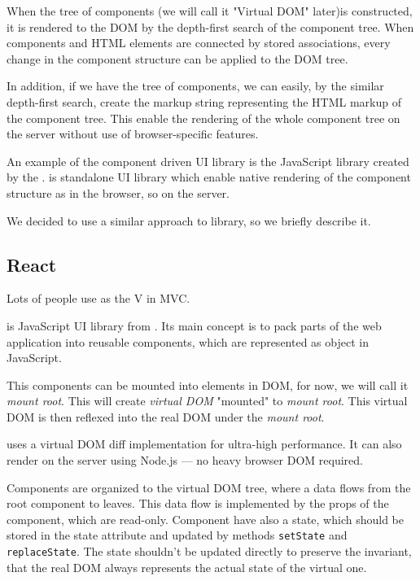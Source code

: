 \documentclass[oneside, 12pt]{book}
\begin{document}
	When the tree of components (we will call it "Virtual DOM" later)is constructed, 
	it is rendered to the DOM by the depth-first search of the component tree.
	When components and HTML elements are connected by stored associations, 
	every change in the component structure can be applied to the DOM tree. 

	In addition, if we have the tree of components, we can easily, by the similar depth-first search, 
	create the markup string representing the HTML markup of the component tree.
	This enable the rendering of the whole component tree on the server without use of browser-specific features.

	An example of the component driven UI library is the JavaScript library \react created by the \facebook.
  \react is standalone UI library which enable native rendering of the component structure as in the browser, so on the server.

	We decided to use a similar approach to \react library, so we briefly describe it.

	\subsection{React}\label{subsec:existing-component-react}
		
		Lots of people use \react as the V in MVC.\cite{react}

		\react is JavaScript UI library from \facebook. 
		Its main concept is to pack parts of the web application into reusable components, 
		which are represented as object in JavaScript. 

		This components can be mounted into elements in DOM, for now, we will call it \textit{mount root}. 
		This will create \textit{virtual DOM} "mounted" to \textit{mount root}. 
		This virtual DOM is then reflexed into the real DOM under the \textit{mount root}.

		\react uses a virtual DOM diff implementation for ultra-high performance. 
		It can also render on the server using Node.js — no heavy browser DOM required.\cite{react}

		Components are organized to the virtual DOM tree, where a data flows from the root component to leaves. 
		This data flow is implemented by the props of the component, which are read-only.
		Component have also a state, which should be stored in the state attribute and updated by methods \texttt{setState} and \texttt{replaceState}. 
		The state shouldn't be updated directly to preserve the invariant, that the real DOM always represents the actual state of the virtual one. 
\end{document}
